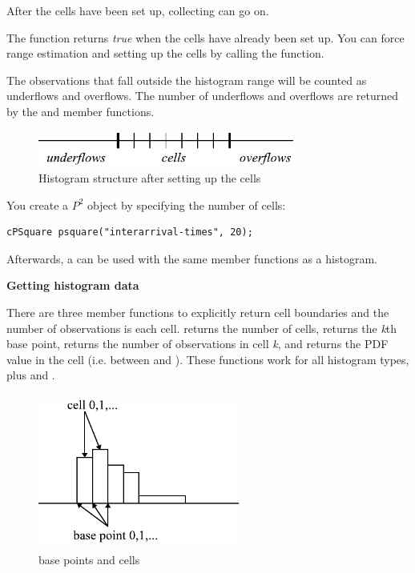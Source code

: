 After the cells have been set up, collecting can go on.

The  function returns \textit{true} when the cells have 
already been set up. You can force range estimation and setting 
up the cells by calling the  function.

The observations that fall outside the histogram range will be counted
as underflows and overflows. The number of underflows and overflows
are returned by the  and 
member functions.

\begin{figure}[htbp]
\begin{center}
  \includegraphics[width=3.310in, height=0.467in]{figures/usmanFig13}
  \caption{Histogram structure after setting up the cells}
\end{center}
\end{figure}

You create a $P^{2}$ object by specifying the number of cells:

\begin{Verbatim}
cPSquare psquare("interarrival-times", 20);
\end{Verbatim}

Afterwards, a  can be used with the same member functions 
as a histogram.


\textbf{Getting histogram data}


There are three member functions to explicitly return cell boundaries
and the number of observations is each cell.  returns
the number of cells,  returns the
\textit{k}th base point,  returns the
number of observations in cell \textit{k}, and
 returns the PDF value in the cell
(i.e. between  and
).  These functions work for all
histogram types, plus  and .

\begin{figure}[htbp]
  \begin{center}
    \includegraphics[width=2.615in, height=2.001in]{figures/usmanFig14}
    \caption{base points and cells}
  \end{center}
\end{figure}

